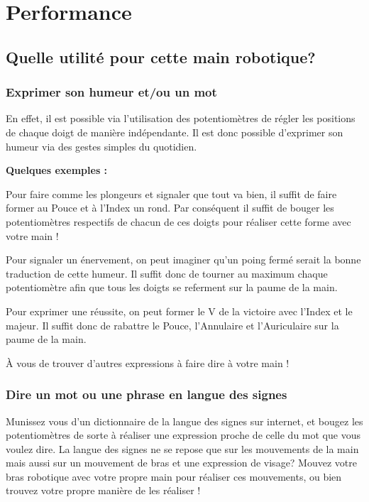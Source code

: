 \section{Performance}

\subsection{Quelle utilité pour cette main robotique?}
\subsubsection{Exprimer son humeur et/ou un mot}

\begin{flushleft}
En effet, il est possible via l'utilisation des potentiomètres de régler les positions de chaque doigt de manière indépendante. Il est donc possible d'exprimer son humeur via des gestes simples du quotidien.\vspace{0.2cm}

\textbf{Quelques exemples :}

Pour faire comme les plongeurs et signaler que tout va bien, il suffit de faire former au Pouce et à l'Index un rond. Par conséquent il suffit de bouger les potentiomètres respectifs de chacun de ces doigts pour réaliser cette forme avec votre main !

Pour signaler un énervement, on peut imaginer qu'un poing fermé serait la bonne traduction de cette humeur. Il suffit donc de tourner au maximum chaque potentiomètre afin que tous les doigts se referment sur la paume de la main.

Pour exprimer une réussite, on peut former le V de la victoire avec l'Index et le majeur. Il suffit donc de rabattre le Pouce, l'Annulaire et l'Auriculaire sur la paume de la main.

\`A vous de trouver d'autres expressions à faire dire à votre main !

\subsubsection{Dire un mot ou une phrase en langue des signes}

Munissez vous d'un dictionnaire de la langue des signes sur internet, et bougez les potentiomètres de sorte à réaliser une expression proche de celle du mot que vous voulez dire. La langue des signes ne se repose que sur les mouvements de la main mais aussi sur un mouvement de bras et une expression de visage? Mouvez votre bras robotique avec votre propre main pour réaliser ces mouvements, ou bien trouvez votre propre manière de les réaliser !


\end{flushleft}
